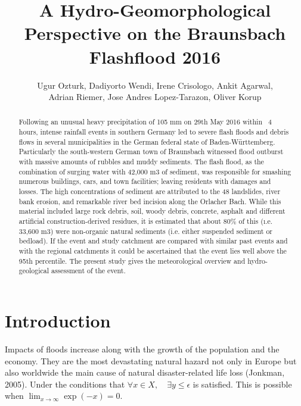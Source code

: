 \documentclass[10pt]{article}
\begin{document}
\title{A Hydro-Geomorphological Perspective on the Braunsbach Flashflood 2016}
\author{Ugur Ozturk, Dadiyorto Wendi, Irene Crisologo, Ankit Agarwal, \\
Adrian Riemer, Jose Andres Lopez-Tarazon, Oliver Korup}
\date{}

\maketitle


\begin{abstract}

Following an unusual heavy precipitation of 105 mm on 29th May 2016 within ~4 hours, intense rainfall events in southern Germany led to severe flash floods and debris flows in several municipalities in the German federal state of Baden-W{\"u}rttemberg. Particularly the south-western German town of Braunsbach witnessed flood outburst with massive amounts of rubbles and muddy sediments. The flash flood, as the combination of surging water with 42,000 m3 of sediment, was responsible for smashing numerous buildings, cars, and town facilities; leaving residents with damages and losses. The high concentrations of sediment are attributed to the 48 landslides, river bank erosion, and remarkable river bed incision along the Orlacher Bach.  While this material included large rock debris, soil, woody debris, concrete, asphalt and different artificial construction-derived residues, it is estimated that about 80\% of this (\i.e. 33,600 m3) were non-organic natural sediments (i.e. either suspended sediment or bedload). If the event and study catchment are compared with similar past events and with the regional catchments it could be ascertained that the event lies well above the 95th percentile. The present study gives the meteorological overview and hydro-geological assessment of the event.

\end{abstract}

\section{Introduction}

Impacts of floods increase along with the growth of the population and the economy. They are the most devastating natural hazard not only in Europe but also worldwide the main cause of natural disaster-related life loss (Jonkman, 2005). Under the conditions that $\forall x \in X, \quad \exists y \leq \epsilon$ is satisfied. This is possible when $\lim_{x \to \infty} \exp(-x) = 0$. 
\end{document}
